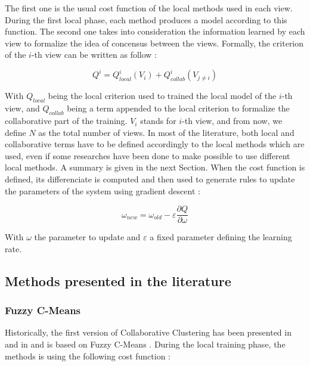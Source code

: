 \documentclass[a4paper]{report}
\begin{document}
    The first one is the usual cost function of the local methods used in each view. During the first local phase, each method produces a model according to this function. The second one takes into consideration the information learned by each view to formalize the idea of concensus between the views. Formally, the criterion of the $i$-th view can be written as follow :

    \begin{equation}
        Q^i = Q^i_{local}(V_i) + Q^i_{collab}(V_{j\neq i})
    \end{equation}

    With $Q_{local}$ being the local criterion used to trained the local model of the $i$-th view, and $Q_{collab}$ being a term appended to the local criterion to formalize the collaborative part of the training. $V_i$ stands for $i$-th view, and from now, we define $N$ as the total number of views. In most of the literature, both local and collaborative terms have to be defined accordingly to the local methods which are used, even if some researches have been done to make possible to use different local methods. A summary is given in the next Section. When the cost function is defined, its differenciate is computed and then used to generate rules to update the parameters of the system using gradient descent : 
    
    \begin{equation}
        \omega_{new} = \omega_{old} - \varepsilon \frac{\partial Q}{\partial \omega}
        \label{eq:gradient_descent}
    \end{equation}
    
    With $\omega$ the parameter to update and $\varepsilon$ a fixed parameter defining the learning rate. 
    
    \subsection{Methods presented in the literature}

    \subsubsection{Fuzzy C-Means}

    Historically, the first version of Collaborative Clustering has been presented in \cite{grozavu2010topological} and in \cite{pedrycz2004fuzzy} and is based on Fuzzy C-Means \cite{bezdek1984fcm}. During the local training phase, the methods is using the following cost function :
\end{document}
